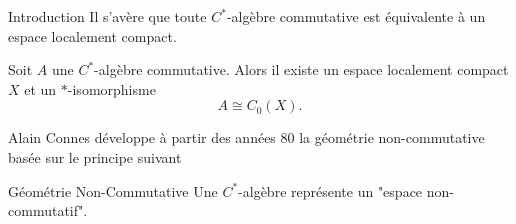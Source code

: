 \begin{frame}{Introduction}
Il s'avère que toute $C^*$-algèbre commutative est équivalente à un espace localement compact.
\begin{thmfr}
Soit $A$ une $C^*$-algèbre commutative. Alors il existe un espace localement compact $X$ et un $*$-isomorphisme 
\[A\cong C_0(X).\]
\end{thmfr}

Alain Connes développe à partir des années 80 la géométrie non-commutative basée sur le principe suivant
\begin{block}{Géométrie Non-Commutative}
Une $C^*$-algèbre représente un "espace non-commutatif". 
\end{block}

\end{frame}
